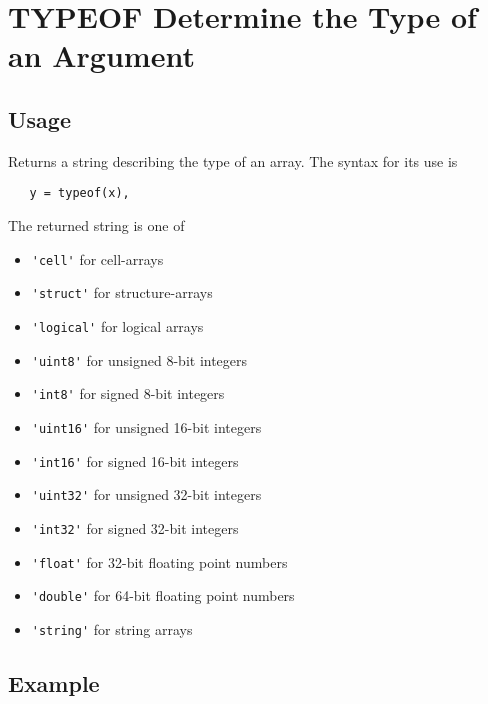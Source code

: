 \section{TYPEOF Determine the Type of an Argument}

\subsection{Usage}

Returns a string describing the type of an array.  The syntax for its use is
\begin{verbatim}
   y = typeof(x),
\end{verbatim}
The returned string is one of
\begin{itemize}
\item  \verb|'cell'| for cell-arrays

\item  \verb|'struct'| for structure-arrays

\item  \verb|'logical'| for logical arrays

\item  \verb|'uint8'| for unsigned 8-bit integers

\item  \verb|'int8'| for signed 8-bit integers

\item  \verb|'uint16'| for unsigned 16-bit integers

\item  \verb|'int16'| for signed 16-bit integers

\item  \verb|'uint32'| for unsigned 32-bit integers

\item  \verb|'int32'| for signed 32-bit integers

\item  \verb|'float'| for 32-bit floating point numbers

\item  \verb|'double'| for 64-bit floating point numbers

\item  \verb|'string'| for string arrays

\end{itemize}
\subsection{Example}

